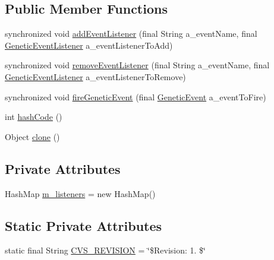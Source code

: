 \subsection*{Public Member Functions}
\begin{DoxyCompactItemize}
\item 
synchronized void \hyperlink{classorg_1_1jgap_1_1event_1_1_event_manager_a11a0d23a492c62449f3b55273f31d0d6}{add\-Event\-Listener} (final String a\-\_\-event\-Name, final \hyperlink{interfaceorg_1_1jgap_1_1event_1_1_genetic_event_listener}{Genetic\-Event\-Listener} a\-\_\-event\-Listener\-To\-Add)
\item 
synchronized void \hyperlink{classorg_1_1jgap_1_1event_1_1_event_manager_a0582aa398963b9ad6d6db869ccd7d76e}{remove\-Event\-Listener} (final String a\-\_\-event\-Name, final \hyperlink{interfaceorg_1_1jgap_1_1event_1_1_genetic_event_listener}{Genetic\-Event\-Listener} a\-\_\-event\-Listener\-To\-Remove)
\item 
synchronized void \hyperlink{classorg_1_1jgap_1_1event_1_1_event_manager_a2b42bc9630de207f83d086f1284fbb69}{fire\-Genetic\-Event} (final \hyperlink{classorg_1_1jgap_1_1event_1_1_genetic_event}{Genetic\-Event} a\-\_\-event\-To\-Fire)
\item 
int \hyperlink{classorg_1_1jgap_1_1event_1_1_event_manager_a6ceb461bba8c3d6de72aba69e5e56e5d}{hash\-Code} ()
\item 
Object \hyperlink{classorg_1_1jgap_1_1event_1_1_event_manager_a0802fd91d0f11805c4740494befa517b}{clone} ()
\end{DoxyCompactItemize}
\subsection*{Private Attributes}
\begin{DoxyCompactItemize}
\item 
Hash\-Map \hyperlink{classorg_1_1jgap_1_1event_1_1_event_manager_a82f36c08bb38ac378babc9b6256f40ce}{m\-\_\-listeners} = new Hash\-Map()
\end{DoxyCompactItemize}
\subsection*{Static Private Attributes}
\begin{DoxyCompactItemize}
\item 
static final String \hyperlink{classorg_1_1jgap_1_1event_1_1_event_manager_a91fab79011659f81ef5badb04845dda8}{C\-V\-S\-\_\-\-R\-E\-V\-I\-S\-I\-O\-N} = \char`\"{}\$Revision\-: 1. \$\char`\"{}
\end{DoxyCompactItemize}
